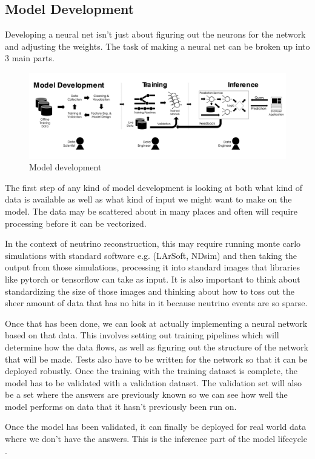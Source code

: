 \subsection{Model Development}

Developing a neural net isn't just about figuring out the neurons for the network and adjusting the weights.
The task of making a neural net can be broken up into 3 main parts.

\begin{figure}[H]
\centering
\includegraphics[width=120mm]{figures/mlLifecycle.png}
\caption{Model development \cite{Yang_2020}}
\label{lifecycle}
\end{figure}

The first step of any kind of model development is looking at both what kind of data is available as well as what kind of input we might want to make on the model.
The data may be scattered about in many places and often will require processing before it can be vectorized.

In the context of neutrino reconstruction, this may require running monte carlo simulations with standard software e.g. (LArSoft, NDsim) and then taking the output from those simulations, processing it into standard images that libraries like pytorch or tensorflow can take as input.
It is also important to think about standardizing the size of those images and thinking about how to toss out the sheer amount of data that has no hits in it because neutrino events are so sparse.

Once that has been done, we can look at actually implementing a neural network based on that data.
This involves setting out training pipelines which will determine how the data flows, as well as figuring out the structure of the network that will be made.
Tests also have to be written for the network so that it can be deployed robustly.
Once the training with the training dataset is complete, the model has to be validated with a validation dataset.
The validation set will also be a set where the answers are previously known so we can see how well the model performs on data that it hasn't previously been run on.

Once the model has been validated, it can finally be deployed for real world data where we don't have the answers.
This is the inference part of the model lifecycle \cite{Zell_1997}.

